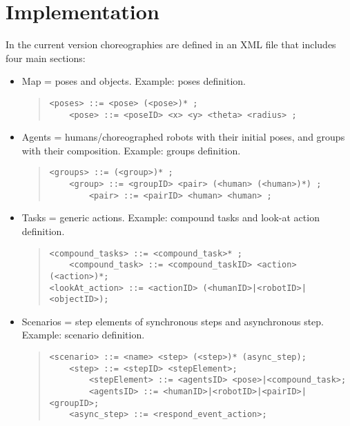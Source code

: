 \section{Implementation}
\label{sec:implementation}
In the current version choreographies are defined in an XML file that includes four main sections:
\begin{itemize}
    \item Map = poses and objects. Example: poses definition.
    {\footnotesize
        \begin{quote}
        \begin{verbatim}
<poses> ::= <pose> (<pose>)* ;
    <pose> ::= <poseID> <x> <y> <theta> <radius> ;
        \end{verbatim}
        \end{quote}
    }
    \item Agents = humans/choreographed robots with their initial poses, and groups with their composition. Example: groups definition.
    {\footnotesize
        \begin{quote}
        \begin{verbatim}
<groups> ::= (<group>)* ; 
    <group> ::= <groupID> <pair> (<human> (<human>)*) ;
        <pair> ::= <pairID> <human> <human> ;
        \end{verbatim}
        \end{quote}
    }
    \item Tasks = generic actions. Example: compound tasks and look-at action definition.
    {\footnotesize \noindent
        \begin{quote}
        \begin{verbatim}
<compound_tasks> ::= <compound_task>* ;
    <compound_task> ::= <compound_taskID> <action> (<action>)*;
<lookAt_action> ::= <actionID> (<humanID>|<robotID>|<objectID>); 
        \end{verbatim}
        \end{quote}
    }
    \item Scenarios = step elements of synchronous steps and asynchronous step. Example: scenario definition. 
    {\footnotesize
        \begin{quote}
        \begin{verbatim}
<scenario> ::= <name> <step> (<step>)* (async_step);
    <step> ::= <stepID> <stepElement>; 
        <stepElement> ::= <agentsID> <pose>|<compound_task>;
        <agentsID> ::= <humanID>|<robotID>|<pairID>|<groupID>;
    <async_step> ::= <respond_event_action>;
        \end{verbatim}
        \end{quote}
    }
\end{itemize}

